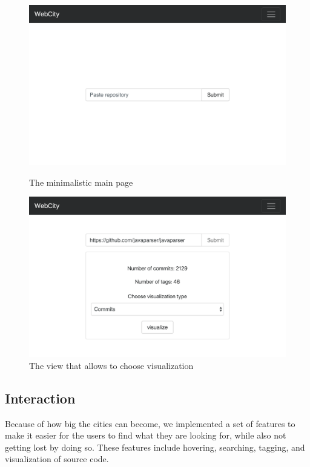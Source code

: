 \documentclass[]{usiinfbachelorproject}
\begin{document}
\begin{figure}[H]
  \centering
  \begin{minipage}[b]{0.49\textwidth}
      \centering
      \includegraphics[width=1\textwidth]{pictures/interface.png}
      \caption{The minimalistic main page}
      \label{fig:interface}
  \end{minipage}
  \hfill
  \begin{minipage}[b]{0.49\textwidth}
      \centering
      \includegraphics[width=1\textwidth]{pictures/interface2.png}
      \caption{The view that allows to choose visualization}
      \label{fig:interface2}
  \end{minipage}
\end{figure}

\subsection{Interaction} \label{Interaction}
Because of how big the cities can become, we implemented a set of features to make it easier for the users to find what they are looking for, while also not getting lost by doing so. These features include hovering, searching, tagging, and visualization of source code.
\end{document}
